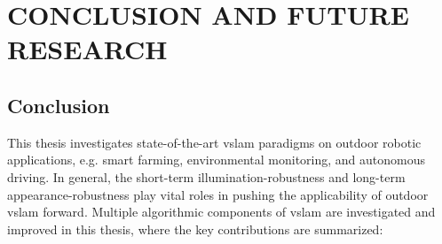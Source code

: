 \chapter{CONCLUSION AND FUTURE RESEARCH}

\section{Conclusion}
This thesis investigates state-of-the-art \acrshort{vslam} paradigms on outdoor robotic applications, e.g. smart farming, environmental monitoring, and autonomous driving.
In general, the short-term illumination-robustness and long-term appearance-robustness play vital roles in pushing the applicability of outdoor \acrshort{vslam} forward. 
Multiple algorithmic components of \acrshort{vslam} are investigated and improved in this thesis, where the key contributions are summarized:

